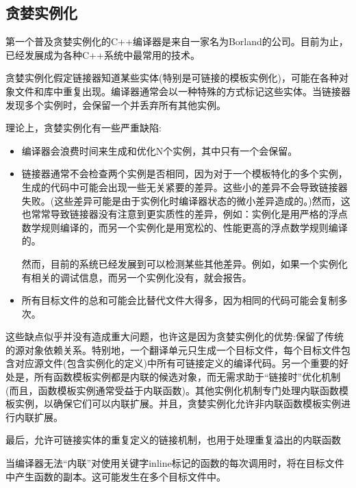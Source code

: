 \subsection{贪婪实例化}

第一个普及贪婪实例化的C++编译器是来自一家名为Borland的公司。目前为止，已经发展成为各种C++系统中最常用的技术。

贪婪实例化假定链接器知道某些实体(特别是可链接的模板实例化)，可能在各种对象文件和库中重复出现。编译器通常会以一种特殊的方式标记这些实体。当链接器发现多个实例时，会保留一个并丢弃所有其他实例。

理论上，贪婪实例化有一些严重缺陷:

\begin{itemize}
\item 
编译器会浪费时间来生成和优化N个实例，其中只有一个会保留。

\item 
链接器通常不会检查两个实例是否相同，因为对于一个模板特化的多个实例，生成的代码中可能会出现一些无关紧要的差异。这些小的差异不会导致链接器失败。(这些差异可能是由于实例化时编译器状态的微小差异造成的。)然而，这也常常导致链接器没有注意到更实质性的差异，例如：实例化是用严格的浮点数学规则编译的，而另一个实例化是用宽松的、性能更高的浮点数学规则编译的。

\begin{notice}
然而，目前的系统已经发展到可以检测某些其他差异。例如，如果一个实例化有相关的调试信息，而另一个实例化没有，就会报告。
\end{notice}

\item 
所有目标文件的总和可能会比替代文件大得多，因为相同的代码可能会复制多次。
\end{itemize}

这些缺点似乎并没有造成重大问题，也许这是因为贪婪实例化的优势:保留了传统的源对象依赖关系。特别地，一个翻译单元只生成一个目标文件，每个目标文件包含对应源文件(包含实例化的定义)中所有可链接定义的编译代码。另一个重要的好处是，所有函数模板实例都是内联的候选对象，而无需求助于“链接时”优化机制(而且，函数模板实例通常受益于内联函数)。其他实例化机制专门处理内联函数模板实例，以确保它们可以内联扩展。并且，贪婪实例化允许非内联函数模板实例进行内联扩展。

最后，允许可链接实体的重复定义的链接机制，也用于处理重复溢出的内联函数

\begin{notice}
当编译器无法“内联”对使用关键字inline标记的函数的每次调用时，将在目标文件中产生函数的副本。这可能发生在多个目标文件中。
\end{notice}

